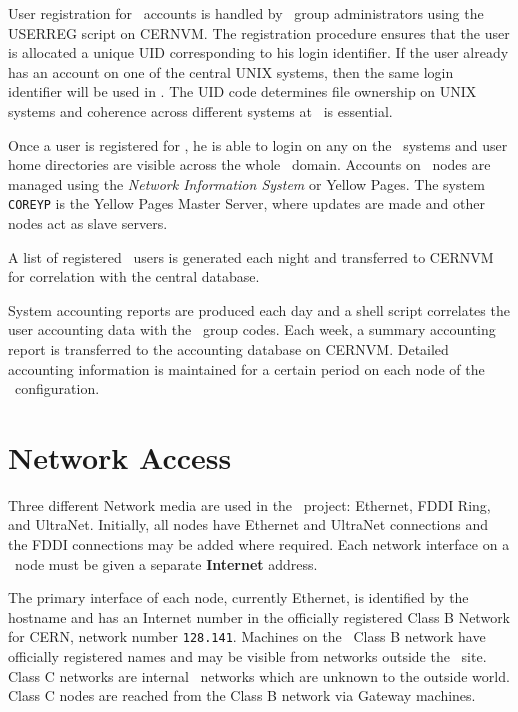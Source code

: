 User registration for \shift\ accounts is handled by \CERN\ group administrators
using the USERREG script on CERNVM.
The registration procedure ensures that the user is allocated
a unique UID corresponding to his login identifier. If the user
already has an account on one of the central UNIX systems, then the
same login identifier will be used in \shift.
The UID code determines file ownership on UNIX systems and
coherence across different systems at \CERN\ is essential.
 
Once a user is registered for \shift, he is able to login on
any on the \shift\ systems and user home directories are visible across the
whole \shift\ domain.
Accounts on \shift\ nodes are managed using the
{\it Network Information System}
or Yellow Pages.
The system
{\tt COREYP} is the Yellow Pages Master Server, where updates are made
and other nodes act as slave servers.
 
A list of registered \shift\ users is generated each night and
transferred to CERNVM for correlation with the central database.
 
System accounting reports are produced each day and a shell script
correlates the user accounting data with the \CERN\ group codes.
Each week, a summary accounting report is transferred to the
accounting database on CERNVM.
Detailed accounting information is maintained for a certain period on
each node of the \shift\ configuration.
 
\section{Network Access}
 
Three different Network media are used in the \shift\ project:
Ethernet, FDDI Ring, and UltraNet.
Initially, all nodes have Ethernet and UltraNet connections and the FDDI
connections may be added where required.
Each network interface on a \shift\ node must be given a separate {\bf Internet}
address.
 
The primary interface of each node, currently Ethernet, is identified
by the hostname and has an Internet number in the
officially registered Class B Network for CERN, network
number {\tt 128.141}.
Machines on the \CERN\ Class B network have officially registered names
and may be visible from networks outside the \CERN\ site. Class C networks
are internal \CERN\ networks which are unknown to the outside world.
Class C nodes are reached from the Class B network via Gateway machines.
 
